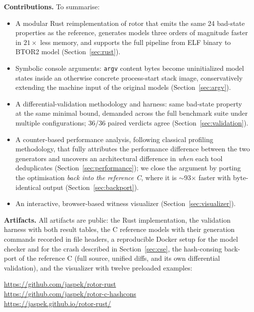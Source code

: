 \documentclass[sigplan,screen,nonacm]{acmart}
\begin{document}
\medskip
\noindent\textbf{Contributions.} To summarise:
\begin{itemize}
  \item A modular Rust reimplementation of rotor that emits the same 24
        bad-state properties as the reference, generates models three
        orders of magnitude faster in $21\times$ less memory, and
        supports the full pipeline from ELF binary to BTOR2 model
        (Section~\ref{sec:rust}).
  \item Symbolic console arguments: \texttt{argv} content bytes become
        uninitialized model states inside an otherwise concrete
        process-start stack image, conservatively extending the machine
        input of the original models (Section~\ref{sec:argv}).
  \item A differential-validation methodology and harness: same
        bad-state property at the same minimal bound, demanded across
        the full benchmark suite under multiple configurations; 36/36
        paired verdicts agree (Section~\ref{sec:validation}).
  \item A counter-based performance analysis, following classical
        profiling methodology, that fully attributes the performance
        difference between the two generators and uncovers an
        architectural difference in \emph{when} each tool deduplicates
        (Section~\ref{sec:performance}); we close the argument by porting
        the optimisation \emph{back into the reference C}, where it is
        $\sim$93$\times$ faster with byte-identical output
        (Section~\ref{sec:backport}).
  \item An interactive, browser-based witness visualizer
        (Section~\ref{sec:visualizer}).
\end{itemize}

\noindent\textbf{Artifacts.} All artifacts are public: the Rust
implementation, the validation harness with both result tables, the C
reference models with their generation commands recorded in file
headers, a reproducible Docker setup for the model checker and for the
crash described in Section~\ref{sec:cse}, the hash-consing back-port of
the reference C (full source, unified diffs, and its own differential
validation), and the visualizer with twelve preloaded examples:
\begin{center}
\footnotesize
\url{https://github.com/jaspek/rotor-rust}\\
\url{https://github.com/jaspek/rotor-c-hashcons}\\
\url{https://jaspek.github.io/rotor-rust/}
\end{center}
\end{document}
